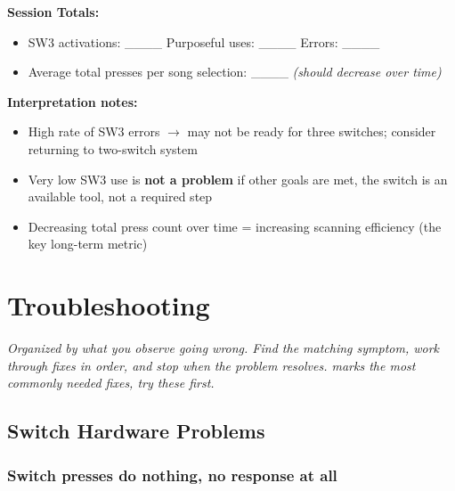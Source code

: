 \documentclass[justified,openright]{tufte-book}
\renewcommand{\chaptermark}[1]{\markboth{#1}{}}
\begin{document}
\textbf{Session Totals:}

\begin{itemize}

\item
  SW3 activations: \_\_\_\_ \quad Purposeful uses: \_\_\_\_ \quad Errors: \_\_\_\_
\item
  Average total presses per song selection: \_\_\_\_ \emph{(should
  decrease over time)}
\end{itemize}

\textbf{Interpretation notes:}
\begin{itemize}

\item High rate of SW3 errors $\rightarrow$ may not be ready for three switches; consider returning to two-switch system
\item Very low SW3 use is \textbf{not a problem} if other goals are met, the switch is an available tool, not a required step
\item Decreasing total press count over time = increasing scanning efficiency (the key long-term metric)
\end{itemize}

\chapter{Troubleshooting}
\label{section-7-troubleshooting-guide}
\chaptermark{Troubleshooting}


\emph{Organized by what you observe going wrong. Find the matching
symptom, work through fixes in order, and stop when the problem
resolves. marks the most commonly needed fixes, try these first.}

\section{Switch Hardware
Problems}\label{switch-hardware-problems}

\subsection{Switch presses do nothing, no response at
all}\label{switch-presses-do-nothing-no-response-at-all}
\end{document}
